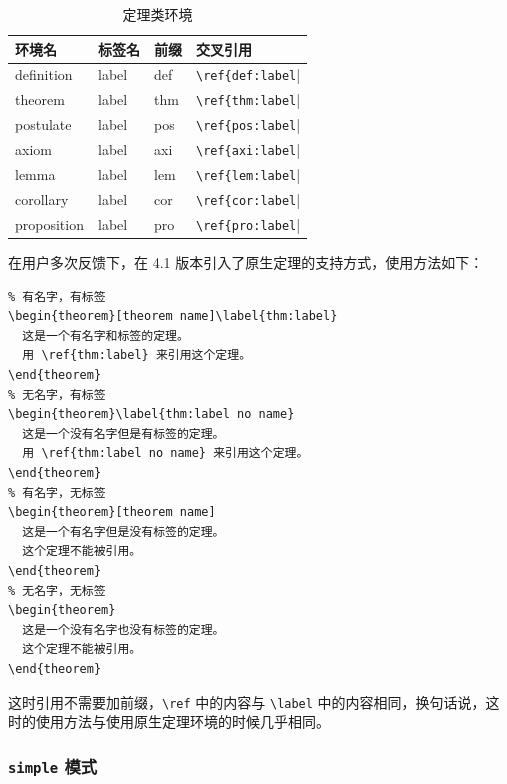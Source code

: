 \documentclass[lang=cn,10pt,scheme=chinese]{boyogalaelegantbook}
\begin{document}
\begin{table}[htbp]
  \centering
  \caption{定理类环境}
    \begin{tabular}{llll}
    \toprule
    环境名 & 标签名 & 前缀 & 交叉引用 \\
    \midrule
    definition & label & def   & \lstinline|\ref{def:label|| \\
    theorem & label & thm   & \lstinline|\ref{thm:label|| \\
    postulate & label & pos & \lstinline|\ref{pos:label|| \\
    axiom & label & axi & \lstinline|\ref{axi:label||\\
    lemma & label & lem   & \lstinline|\ref{lem:label|| \\
    corollary & label & cor   & \lstinline|\ref{cor:label|| \\
    proposition & label & pro   & \lstinline|\ref{pro:label|| \\
    \bottomrule
    \end{tabular}%
  \label{tab:theorem-class}%
\end{table}%

在用户多次反馈下，在 4.1 版本引入了原生定理的支持方式，使用方法如下：

\begin{lstlisting}
% 有名字，有标签
\begin{theorem}[theorem name]\label{thm:label}
  这是一个有名字和标签的定理。
  用 \ref{thm:label} 来引用这个定理。
\end{theorem}
% 无名字，有标签
\begin{theorem}\label{thm:label no name}
  这是一个没有名字但是有标签的定理。
  用 \ref{thm:label no name} 来引用这个定理。
\end{theorem}
% 有名字，无标签
\begin{theorem}[theorem name]
  这是一个有名字但是没有标签的定理。
  这个定理不能被引用。
\end{theorem}
% 无名字，无标签
\begin{theorem}
  这是一个没有名字也没有标签的定理。
  这个定理不能被引用。
\end{theorem}
\end{lstlisting}
这时引用不需要加前缀，\lstinline{\ref} 中的内容与 \lstinline{\label} 中的内容相同，换句话说，这时的使用方法与使用原生定理环境的时候几乎相同。

\subsubsection{\texttt{simple} 模式}
\end{document}
